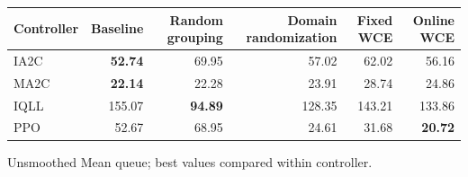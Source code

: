 \begin{tabular}{lrrrrr}
\hline
Controller & Baseline & Random grouping & Domain randomization & Fixed WCE & Online WCE \\
\hline
IA2C & \textbf{52.74} & 69.95 & 57.02 & 62.02 & 56.16 \\
MA2C & \textbf{22.14} & 22.28 & 23.91 & 28.74 & 24.86 \\
IQLL & 155.07 & \textbf{94.89} & 128.35 & 143.21 & 133.86 \\
PPO & 52.67 & 68.95 & 24.61 & 31.68 & \textbf{20.72} \\
\hline
\end{tabular}
Unsmoothed Mean queue; best values compared within controller.
